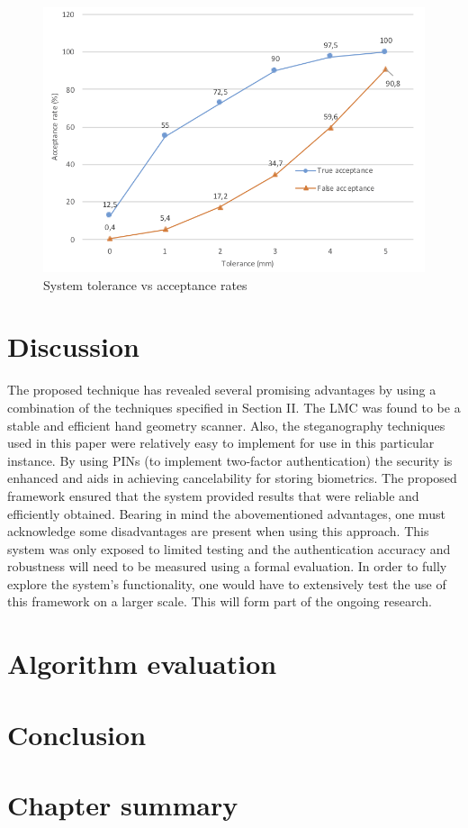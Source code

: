     
    \begin{figure}[htbp!] 
    \centering    
    \includegraphics[width=1.0\textwidth]{Chapter4/Figs/Tolerance.png}
    \caption[System tolerance vs acceptance rates]{System tolerance vs acceptance rates}
    \label{fig:System tolerance vs acceptance rates}
    \end{figure}


\section{Discussion}

The proposed technique has revealed several promising advantages by using a combination of the techniques specified in Section II. The LMC was found to be a stable and efficient hand geometry scanner. Also, the steganography techniques used in this paper were relatively easy to implement for use in this particular instance. By using PINs (to implement two-factor authentication) the security is enhanced and aids in achieving cancelability for storing biometrics. The proposed framework ensured that the system provided results that were reliable and efficiently obtained.
Bearing in mind the abovementioned advantages, one must acknowledge some disadvantages are present when using this approach. This system was only exposed to limited testing and the authentication accuracy and robustness will need to be measured using a formal evaluation. In order to fully explore the system’s functionality, one would have to extensively test the use of this framework on a larger scale. This will form part of the ongoing research.



\section{Algorithm evaluation}

\section{Conclusion}

\section{Chapter summary}
